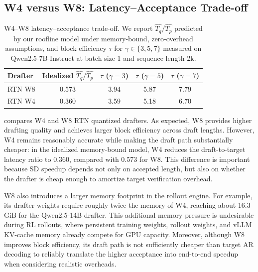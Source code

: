 \documentclass{llmxive}
\providecommand{\DrafterDist}{q}
\providecommand{\TargetDist}{p}
\providecommand{\TargetTime}{T_\TargetDist}
\providecommand{\DraftTime}{T_\DrafterDist}
\providecommand{\arraystretch}{1.18}
\begin{document}
\subsection{W4 versus W8: Latency--Acceptance Trade-off}
\label{app:w4_vs_w8}

\begin{table}[t]
\centering
\small
\setlength{\tabcolsep}{6pt}
\renewcommand{\arraystretch}{1.10}
\vspace{1mm}
\begin{tabular}{lcccc}
\toprule
\textbf{Drafter}
&
\makecell{\textbf{Idealized}\\$\widehat{\DraftTime}/\widehat{\TargetTime}$}
&
\makecell{\boldmath$\tau$\\\textbf{($\gamma=3$)}}
&
\makecell{\boldmath$\tau$\\\textbf{($\gamma=5$)}}
&
\makecell{\boldmath$\tau$\\\textbf{($\gamma=7$)}} \\
\midrule
RTN W8 & 0.573 & 3.94 & 5.87 & 7.79 \\
RTN W4 & 0.360 & 3.59 & 5.18 & 6.70 \\
\bottomrule
\end{tabular}
\caption{
W4--W8 latency--acceptance trade-off.
We report $\widehat{\DraftTime}/\widehat{\TargetTime}$ predicted by our roofline model under memory-bound, zero-overhead assumptions, and block efficiency $\tau$ for $\gamma \in \{3,5,7\}$ measured on Qwen2.5-7B-Instruct at batch size 1 and sequence length 2k.
}
\label{tab:w4_vs_w8}
\end{table}

 compares W4 and W8 RTN quantized drafters.
As expected, W8 provides higher drafting quality and achieves larger block efficiency across draft lengths.
However, W4 remains reasonably accurate while making the draft path substantially cheaper: in the idealized memory-bound model, W4 reduces the draft-to-target latency ratio to 0.360, compared with 0.573 for W8.
This difference is important because SD speedup depends not only on accepted length, but also on whether the drafter is cheap enough to amortize target verification overhead.

W8 also introduces a larger memory footprint in the rollout engine.
For example, its drafter weights require roughly twice the memory of W4, reaching about 16.3\,GiB for the Qwen2.5-14B drafter.
This additional memory pressure is undesirable during RL rollouts, where persistent training weights, rollout weights, and vLLM KV-cache memory already compete for GPU capacity.
Moreover, although W8 improves block efficiency, its draft path is not sufficiently cheaper than target AR decoding to reliably translate the higher acceptance into end-to-end speedup when considering realistic overheads.
\end{document}
